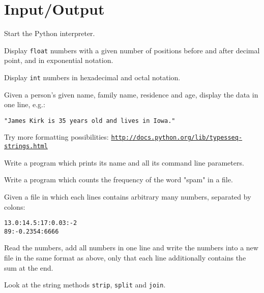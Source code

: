\newpage

\section*{Input/Output}
\begin{aufgabe}
Start the Python interpreter.
\begin{auflistung}
\item Display \lstinline{float} numbers with a given number of positions before and after decimal point, and in exponential notation.
\item Display \lstinline{int} numbers in hexadecimal and octal notation.
\item Given a person's given name, family name, residence and age, display the data in one line, e.g.:
\begin{verbatim}
"James Kirk is 35 years old and lives in Iowa."
\end{verbatim}
\item Try more formatting possibilities: \texttt{\underline{http://docs.python.org/lib/typesseq-strings.html}}
\end{auflistung}
\end{aufgabe}

\begin{aufgabe}
Write a program which prints its name and all its command line parameters.
\end{aufgabe}

\begin{aufgabe}
Write a program which counts the frequency of the word "spam" in a file. 
\end{aufgabe}

\begin{aufgabe}
Given a file in which each lines contains arbitrary many numbers, separated by colons:
\begin{verbatim}
13.0:14.5:17:0.03:-2
89:-0.2354:6666
\end{verbatim}
Read the numbers, add all numbers in one line and write the numbers into a new file in the same format as above, only that each line additionally contains the sum at the end.

\hinweis Look at the string methods \lstinline{strip}, \lstinline{split} and \lstinline{join}.
\end{aufgabe}


